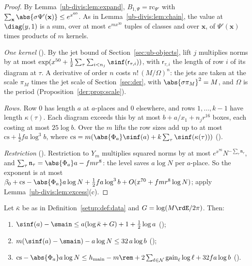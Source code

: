 \begin{proof}
By Lemma~\ref{ub-divis:lem:expand}, $B_{1,\Psi}=\mathrm{rc}_{\Psi'}$ with
$\sum_{\mathbf x}\abs{\sigma\Psi'(\mathbf x)}\le e^{x^{60}}$. As in Lemma~\ref{ub-divis:lem:chain}, the value at
$\diag(y,1)$ is a sum, over at most $e^{mx^{30}}$ tuples of classes and over $\mathbf x$, of $\Psi'(\mathbf x)$
times products of $m$ kernels.

\emph{One kernel} (). By the jet bound of
Section~\ref{sec:ub-objects}, lift $j$ multiplies norms by at most
$\exp(x^{50}+\frac12\sum_\tau\sum_{i<n_j}\sinf(\mathsf r_{\tau,i}))$, with $\mathsf r_{\tau,i}$ the length of
row $i$ of its diagram at $\tau$. A derivative of order $n$ costs $n!\,(M/\Omega)^n$: the jets are
taken at the scale $\pi_M$ times the jet scale of Section~\ref{sec:der}, with
$\abs{\sigma\pi_M}^2=M$, and $\Omega$ is the period (Proposition~\ref{der:prop:scale}).

\emph{Rows.} Row $0$ has length $a$ at $a$-places and $0$ elsewhere, and rows $1,\dots,k-1$ have
length $\kappa(\tau)$. Each diagram exceeds this by at most $b+a/x_1+n_jr^{16}$ boxes, each costing
at most $25\log b$. Over the $m$ lifts the row sizes add up to at most $\mathrm{cs}+
\frac12fa\log^3b$, where $\mathrm{cs}=m(\abs{\Phi_a}\sinf(a)+k\sum_\tau\sinf(\kappa(\tau)))$
().

\emph{Restriction} (). Restriction to $Y_m$ multiplies
squared norms by at most $e^{x^{70}}N^{-\sum_\tau \mathfrak n_\tau}$, and $\sum_\tau
\mathfrak n_\tau=\abs{\Phi_a}a-fmr^8$: the level saves $a\log N$ per $a$-place. So the exponent is at most
$\beta_0+\mathrm{cs}-\abs{\Phi_a}a\log N+\frac12fa\log^3b+O(x^{70}+fmr^8\log N)$; apply
Lemma~\ref{ub-divis:lem:excess}(c).
\end{proof}

\begin{lemma}\label{ub-divis:lem:excess}
Let $\bar\kappa$ be as in Definition~\ref{setup:def:data} and $G=\log(M\rdE/2\pi)$. Then:
\begin{enumerate}[label=(\alph*)]
\item $\sinf(a)-\smain\le a(\log\bar\kappa+G)+1+\frac12\log a$
  ();
\item $m(\sinf(a)-\smain)-a\log N\le32\,a\log b$
  ();
\item $\mathrm{cs}-\abs{\Phi_a}a\log N\le h_{\mathrm{main}}-m\rem+2\sum_{\ell\in\mathcal N}\mathrm{gain}_\ell\log \ell+32fa\log b$ ().
\end{enumerate}
\end{lemma}

